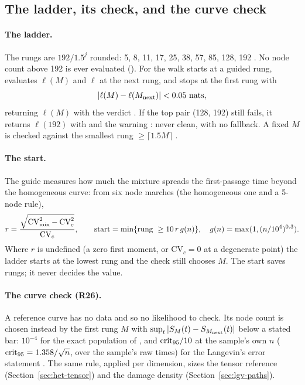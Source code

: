 \subsection{The ladder, its check, and the curve check}\label{sec:het-ladder}

\paragraph{The ladder.} The rungs are $192/1.5^j$ rounded: 5, 8, 11, 17, 25, 38, 57, 85, 128, 192
. No node count above 192 is ever evaluated (). For  the walk
 starts at a guided rung, evaluates $\ell(M)$ and $\ell$ at the next rung, and stops at
the first rung with
\begin{equation}\label{eq:het-check}
  |\ell(M)-\ell(M_{\rm next})|<0.05\ \text{nats},
\end{equation}
returning $\ell(M)$ with the verdict . If the top pair (128, 192) still fails, it returns $\ell(192)$
with  and the warning : never clean, with no fallback. A fixed $M$ is
checked against the smallest rung $\ge\lceil1.5M\rceil$ .

\paragraph{The start.} The guide  measures how much the mixture spreads the
first-passage time beyond the homogeneous curve: from six node marches (the homogeneous one and a 5-node rule),
\begin{equation}
  r=\frac{\sqrt{\mathrm{CV}_{\rm mix}^2-\mathrm{CV}_c^2}}{\mathrm{CV}_c},\qquad
  \text{start}=\min\{\text{rung}\ \ge 10\,r\,g(n)\},\quad g(n)=\max(1,(n/10^4)^{0.3}).
\end{equation}
Where $r$ is undefined (a zero first moment, or $\mathrm{CV}_c=0$ at a degenerate point) the ladder starts at the
lowest rung and the check still chooses $M$. The start saves rungs; it never decides the value.

\paragraph{The curve check (R26).} A reference curve has no data and so no likelihood to check. Its node count is
chosen instead by the first rung $M$ with $\sup_t|S_M(t)-S_{M_{\rm next}}(t)|$ below a stated bar: $10^{-4}$ for the
exact population of  , and ${\rm crit}_{95}/10$ at the
sample's own $n$ (${\rm crit}_{95}=1.358/\sqrt n$, over the sample's raw times) for the Langevin's error statement
. The same rule, applied per dimension, sizes the tensor reference
(Section~\ref{sec:het-tensor}) and the damage density (Section~\ref{sec:lgv-paths}).

